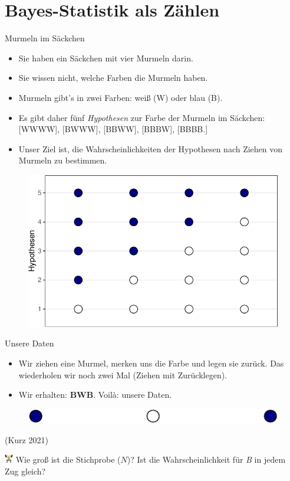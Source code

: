 \documentclass[
  ngerman,
  ignorenonframetext,
]{beamer}
\begin{document}
\hypertarget{bayes-statistik-als-zuxe4hlen}{%
\section{Bayes-Statistik als
Zählen}\label{bayes-statistik-als-zuxe4hlen}}

\begin{frame}{Murmeln im Säckchen}
\protect\hypertarget{murmeln-im-suxe4ckchen}{}
\begin{itemize}
\item
  Sie haben ein Säckchen mit vier Murmeln darin.
\item
  Sie wissen nicht, welche Farben die Murmeln haben.
\item
  Murmeln gibt's in zwei Farben: weiß (W) oder blau (B).
\item
  Es gibt daher fünf \emph{Hypothesen} zur Farbe der Murmeln im
  Säckchen: {[}WWWW{]}, {[}BWWW{]}, {[}BBWW{]}, {[}BBBW{]}, {[}BBBB.{]}
\item
  Unser Ziel ist, die Wahrscheinlichkeiten der Hypothesen nach Ziehen
  von Murmeln zu bestimmen.
\end{itemize}

\begin{figure}[H]
\includegraphics[width=0.5\linewidth]{unnamed-chunk-6-1} \end{figure}
\end{frame}

\begin{frame}{Unsere Daten}
\protect\hypertarget{unsere-daten}{}
\begin{itemize}
\item
  Wir ziehen eine Murmel, merken uns die Farbe und legen sie zurück. Das
  wiederholen wir noch zwei Mal (Ziehen mit Zurücklegen).
\item
  Wir erhalten: \textbf{BWB}. Voilà: unsere Daten.
\end{itemize}

\begin{figure}[H]
\includegraphics[width=0.7\linewidth]{unnamed-chunk-7-1} \end{figure}

(Kurz 2021)

\includegraphics[width=1em]{../img/weight.pdf} Wie groß ist die
Stichprobe (\(N\))? Ist die Wahrscheinlichkeit für \emph{B} in jedem Zug
gleich?
\end{frame}
\end{document}
